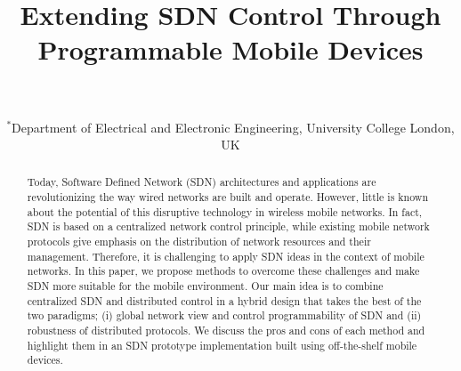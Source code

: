 \documentclass[10pt]{IEEEtran}
\begin{document}
\title{Extending SDN Control Through Programmable Mobile Devices}


\author{
\\
\\
{$^{*}${Department of Electrical and Electronic Engineering, University College London, UK}}
}
 \vspace{-5mm}

\maketitle

\thispagestyle{empty}

\begin{abstract}
Today, Software Defined Network (SDN) architectures and applications are revolutionizing the way wired networks are built and operate. However, little is known about the potential of this disruptive technology in wireless mobile networks. In fact, SDN is based on a centralized network control principle, while existing mobile network protocols give emphasis on the distribution of network resources and their management. Therefore, it is challenging to apply SDN ideas in the context of mobile networks. In this paper, we propose methods to overcome these challenges and make SDN more suitable for the mobile environment. Our main idea is to combine centralized SDN and distributed control in a hybrid design that takes the best of the two paradigms; (i) global network view and control programmability of SDN and (ii) robustness of distributed protocols. We discuss the pros and cons of each method and highlight them in an SDN prototype implementation built using off-the-shelf mobile devices.
\end{abstract}


\end{document}
